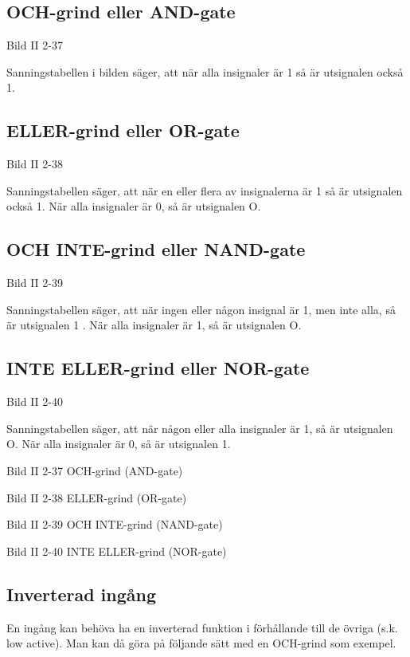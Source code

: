\subsection{OCH-grind eller AND-gate}

Bild II 2-37

Sanningstabellen i bilden säger, att när alla insignaler är 1 så är utsignalen
också 1.

\subsection{ELLER-grind eller OR-gate}

Bild II 2-38

Sanningstabellen säger, att när en eller flera av insignalerna är 1 så är
utsignalen också 1. När alla insignaler är 0, så är utsignalen O.

\subsection{OCH INTE-grind eller NAND-gate}

Bild II 2-39

Sanningstabellen säger, att när ingen eller någon insignal är 1, men inte alla,
så är utsignalen 1 . När alla insignaler är 1, så är utsignalen O.

\subsection{INTE ELLER-grind eller NOR-gate}

Bild II 2-40

Sanningstabellen säger, att när någon eller alla insignaler är 1, så är
utsignalen O. När alla insignaler är 0, så är utsignalen 1.

Bild II 2-37 OCH-grind (AND-gate)

Bild II 2-38 ELLER-grind (OR-gate)

Bild II 2-39 OCH INTE-grind (NAND-gate)

Bild II 2-40 INTE ELLER-grind (NOR-gate)

\subsection{Inverterad ingång}

En ingång kan behöva ha en inverterad funktion i förhållande till de övriga
(s.k. low active). Man kan då göra på följande sätt med en OCH-grind som
exempel.


